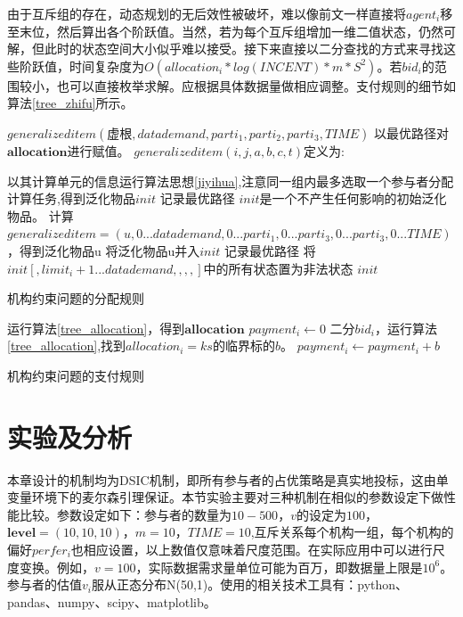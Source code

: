 \documentclass[promaster]{thesis-uestc}
\begin{document}
由于互斥组的存在，动态规划的无后效性被破坏，难以像前文一样直接将$agent_i$移至末位，然后算出各个阶跃值。当然，若为每个互斥组增加一维二值状态，仍然可解，但此时的状态空间大小似乎难以接受。接下来直接以二分查找的方式来寻找这些阶跃值，时间复杂度为$O(allocation_i*log(INCENT)*m*S^2)$。若$bid_i$的范围较小，也可以直接枚举求解。应根据具体数据量做相应调整。支付规则的细节如算法\ref{tree_zhifu}所示。

\begin{algorithm}[h]
    $generalizeditem(\text{虚根},datademand,parti_1,parti_2,parti_3,TIME)$\;
    以最优路径对$\mathbf{allocation}$进行赋值。\;
    \;
    $generalizeditem(i,j,a,b,c,t)$定义为:\;
    
    {
        以其计算单元的信息运行算法思想\ref{jiyihua},注意同一组内最多选取一个参与者分配计算任务,得到泛化物品$init$\;
        记录最优路径\;
    }{
        $init$是一个不产生任何影响的初始泛化物品。
    }
    {
        计算$generalizeditem=(u,0...datademand,0...parti_1,0...parti_3,0...parti_3,0...TIME)$，得到泛化物品u\;
        将泛化物品u并入$init$\;
        记录最优路径\;
    }
    将$init[,limit_i+1...datademand,,,,]$中的所有状态置为非法状态\;
    \Return $init$\;
\caption{机构约束问题的分配规则}
\label{tree_allocation}
\end{algorithm}

\begin{algorithm}[h]
    运行算法\ref{tree_allocation}，得到$\mathbf{allocation}$\;
    {
        $payment_i \leftarrow 0$\;
        {
            二分$bid_i$，运行算法\ref{tree_allocation},找到$allocation_i = ks$的临界标的$b$。
            $payment_i \leftarrow payment_i + b$
        }
    }
\caption{机构约束问题的支付规则}
\label{tree_zhifu}
\end{algorithm}

\FloatBarrier

\section{实验及分析}
本章设计的机制均为DSIC机制，即所有参与者的占优策略是真实地投标，这由单变量环境下的麦尔森引理保证。本节实验主要对三种机制在相似的参数设定下做性能比较。参数设定如下：参与者的数量为$10-500$，$v$的设定为$100$，$\mathbf{level}=(10,10,10)$，$m=10$，$TIME=10$,互斥关系每个机构一组，每个机构的偏好$perfer_i$也相应设置，以上数值仅意味着尺度范围。在实际应用中可以进行尺度变换。例如，$v=100$，实际数据需求量单位可能为百万，即数据量上限是$10^6$。参与者的估值$v_i$服从正态分布N(50,1)。使用的相关技术工具有：python、pandas、numpy、scipy、matplotlib。
\end{document}
